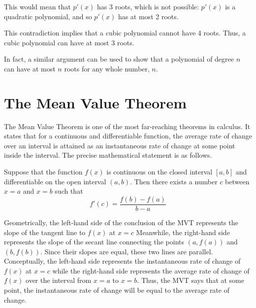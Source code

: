 \documentclass[handout]{ximera}
\begin{document}
\begin{example}
This would mean that $p'(x)$ has 3 roots, which is not possible: 
 $p'(x)$ is a quadratic polynomial, and so $p'(x)$ has at most 2 roots.
 
This contradiction implies that a cubic polynomial cannot have 4 roots. Thus, a cubic polynomial can have at most 3 roots.

In fact, a similar argument can be used to show that a polynomial of degree $n$ can have at most $n$ roots for any whole number, $n$.  
\end{example}




\section{The Mean Value Theorem}


The Mean Value Theorem is one of the most far-reaching theorems in calculus. It states that for a continuous 
and differentiable function, the average rate of change over an interval is attained as an 
instantaneous rate of change at some point inside the interval. The precise mathematical statement is as follows.\\

\begin{theorem}
Suppose that the function $f(x)$ is continuous on the closed interval $[a,b]$ and differentiable on the 
open interval $(a,b)$. Then there exists a number $c$ between $x = a$ and $x = b$ such that
\[f'(c) = \frac{f(b) - f(a)}{b-a}\]

\end{theorem}



Geometrically, the left-hand side of the conclusion of the MVT represents the slope of the tangent line to $f(x)$ at $x = c$ 
Meanwhile, the right-hand side represents the slope of the secant line connecting the points $(a, f(a))$ and $(b, f(b))$. 
Since their slopes are equal, these two lines are parallel.
Conceptually, the left-hand side represents the instantaneous rate of change of $f(x)$ at $x = c$ while the
right-hand side represents the average rate of change of $f(x)$ over the interval from $x=a$ to $x=b$. 
Thus, the MVT says that at some point, the instantaneous rate of change will be equal to the average rate of change.
\end{document}
